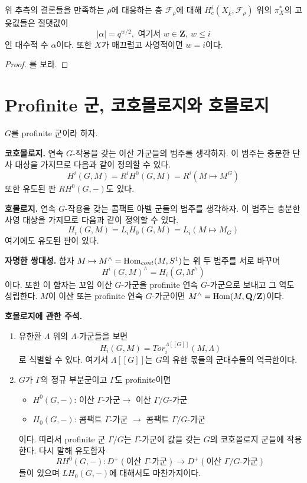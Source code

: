 \begin{theorem}
\label{theorem-weil-II}
위 추측의 결론들을 만족하는 $\rho$에 대응하는 층
$\mathcal{F}_\rho$에 대해 $H_c^i(X_{\overline{k}},
\mathcal{F}_{\rho})$ 위의 $\pi_X^*$의 고윳값들은 절댓값이
$$
|\alpha|=q^{w/2}, \text{ 여기서 }w\in \mathbf{Z},\ w\leq i
$$
인 대수적 수 $\alpha$이다. 또한 $X$가 매끄럽고 사영적이면 $w = i$이다.
\end{theorem}

\begin{proof}
\cite{WeilII}를 보라.
\end{proof}




\section{Profinite 군, 코호몰로지와 호몰로지}
\label{section-profinite-cohomology}

\noindent
$G$를 profinite 군이라 하자.

\medskip\noindent
{\bf 코호몰로지.}
연속 $G$-작용을 갖는 이산 가군들의 범주를 생각하자. 이 범주는 충분한
단사 대상을 가지므로 다음과 같이 정의할 수 있다.
$$
H^i(G, M) = R^iH^0(G, M) = R^i(M\mapsto M^G)
$$
또한 유도된 판 $RH^0(G, -)$도 있다.

\medskip\noindent
{\bf 호몰로지.}
연속 $G$-작용을 갖는 콤팩트 아벨 군들의 범주를 생각하자. 이 범주는
충분한 사영 대상을 가지므로 다음과 같이 정의할 수 있다.
$$
H_i(G, M) = L_iH_0(G, M)=L_i(M\mapsto M_G)
$$
여기에도 유도된 판이 있다.

\medskip\noindent
{\bf 자명한 쌍대성.}
함자 $M\mapsto M^\wedge = \mathop{\mathrm{Hom}}\nolimits_{cont}(M, S^1)$는 위 두 범주를 서로
바꾸며
$$
H^i(G, M)^\wedge = H_i(G, M^\wedge)
$$
이다. 또한 이 함자는 꼬임 이산 $G$-가군을 profinite 연속 $G$-가군으로
보내고 그 역도 성립한다. $M$이 이산 또는 profinite 연속 $G$-가군이면
$M^\wedge = \mathop{\mathrm{Hom}}\nolimits(M, \mathbf{Q}/\mathbf{Z})$이다.

\medskip\noindent
{\bf 호몰로지에 관한 주석.}
\begin{enumerate}
\item 유한환 $\Lambda$ 위의 $\Lambda$-가군들을 보면
$$
H_i(G, M)=Tor_i^{\Lambda[[G]]}(M, \Lambda)
$$
로 식별할 수 있다. 여기서 $\Lambda[[G]]$는 $G$의 유한 몫들의 군대수들의
역극한이다.
\item $G$가 $\Gamma$의 정규 부분군이고 $\Gamma$도 profinite이면
\begin{itemize}
\item $H^0(G, -)$: 이산 $\Gamma$-가군$\to$ 이산 $\Gamma/G$-가군
\item $H_0(G, -)$: 콤팩트 $\Gamma$-가군 $\to$ 콤팩트 $\Gamma/G$-가군
\end{itemize}
이다. 따라서 profinite 군 $\Gamma/G$는 $\Gamma$-가군에 값을 갖는
$G$의 코호몰로지 군들에 작용한다. 다시 말해 유도함자
$$
RH^0(G, -) :
D^{+}(\text{이산 }\Gamma\text{-가군})
\longrightarrow
D^{+}(\text{이산 }\Gamma/G\text{-가군})
$$
들이 있으며 $LH_0(G, -)$에 대해서도 마찬가지이다.
\end{enumerate}








